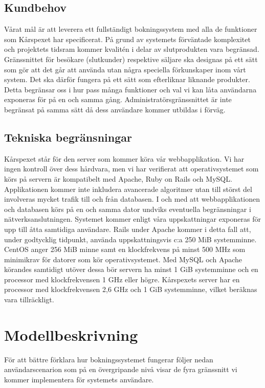 \documentclass[a4paper, twoside, 11pt, titlepage]{article}
\begin{document}
	\subsection{Kundbehov}


	Vårat mål är att leverera ett fullständigt bokningssystem med alla de funktioner som Kårspexet har specificerat. På grund av systemets förväntade komplexitet och projektets tidsram kommer kvalitén i delar av slutprodukten vara begränsad. Gränssnittet för besökare (slutkunder) respektive säljare ska designas på ett sätt som gör att det går att använda utan några speciella förkunskaper inom vårt system. Det ska därför fungera på ett sätt som efterliknar liknande produkter. Detta begränsar oss i hur pass många funktioner och val vi kan låta användarna exponeras för på en och samma gång. Administratörsgränssnittet är inte begränsat på samma sätt då dess användare kommer utbildas i förväg.

	\subsection{Tekniska begränsningar}


	Kårspexet står för den server som kommer köra vår webbapplikation. Vi har ingen kontroll över dess hårdvara, men vi har verifierat att operativsystemet som körs på servern är kompatibelt med Apache, Ruby on Rails och MySQL. Applikationen kommer inte inkludera avancerade algoritmer utan till störst del involveras mycket trafik till och från databasen. I och med att webbapplikationen och databasen körs på en och samma dator undviks eventuella begränsningar i nätverksanslutningen. Systemet kommer enligt våra uppskattningar exponeras för upp till åtta samtidiga användare. Rails under Apache kommer i detta fall att, under godtycklig tidpunkt, använda uppskattningsvis c:a 250 MiB systemminne. CentOS anger 256 MiB minne samt en klockfrekvens på minst 500 MHz som minimikrav för datorer som kör operativsystemet. Med MySQL och Apache körandes samtidigt utöver dessa bör servern ha minst 1 GiB systemminne och en processor med klockfrekvensen 1 GHz eller högre. Kårspexets server har en processor med klockfrekvensen 2,6 GHz och 1 GiB systemminne, vilket beräknas vara tillräckligt.

\clearpage
\section{Modellbeskrivning}


För att bättre förklara hur bokningssystemet fungerar följer nedan användarscenarion som på en övergripande nivå visar de fyra gränssnitt vi kommer implementera för systemets användare.
\end{document}

